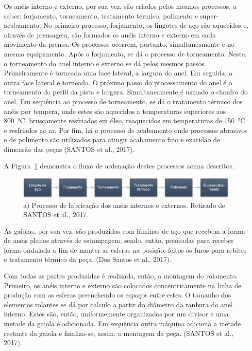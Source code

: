 \documentclass[
	12pt,				
	oneside,			
	a4paper,			
	english,			
	brazil,			
	]{abntex2ppgsi}
\begin{document}
Os anéis interno e externo, por sua vez, são criados pelos mesmos processos, a saber: forjamento, torneamento, tratamento térmico, polimento e super-acabamento. No  primeiro processo, forjamento, os lingotes de aço são aquecidos e, através de prensagem, são formados os anéis interno e externo em cada movimento da prensa. Os processos ocorrem, portanto, simultaneamente e no mesmo equipamento. Após o forjamento, se dá o processo de torneamento. Neste, o torneamento do anel interno e externo se dá pelos mesmos passos. Primeiramente é torneada uma face lateral, a largura do anel. Em seguida, a outra face lateral é torneada. O próximo passo do processamento do anel é o torneamento do perfil da pista e largura. Simultaneamente é usinado o chanfro do anel. Em sequência ao processo de torneamento, se dá o tratamento térmico dos anéis por tempera, onde estes são aquecidos a temperaturas superiores aos \SI{800}{\celsius}, bruscamente resfriados em óleo, reaquecidos em temperaturas de \SI{150}{\celsius} e resfriados ao ar. Por fim, há o processo de acabamento onde processos abrasivos e de polimento são utilizados para atingir acabamento fino e exatidão de dimensão das peças (SANTOS et al., 2017). 


A Figura~\ref{FiguraProcessoFabricacao} demonstra o fluxo de ordenação destes processos acima descritos.
\begin{figure}[!htb]
\centering
\includegraphics[width=\textwidth,height=\textheight,keepaspectratio]{Figura2}
\caption{a) Processo de fabricação dos anéis internos e externos. Retirado de SANTOS et al., 2017.}
\label{FiguraProcessoFabricacao}
\end{figure}

As gaiolas, por sua vez, são produzidas com lâminas de aço que recebem a forma de anéis planos através de estampagem, sendo, então, prensadas para receber forma ondulada a fim de manter as esferas na posição, feitos os furos para rebites e tratamento térmico da peça. (Dos Santos et al., 2017).
 
Com todas as partes produzidas é realizada, então, a montagem do rolamento. Primeiro, os anéis interno e externo são colocados concentricamente na linha de produção com as esferas preenchendo os espaços entre estes. O tamanho dos elementos rolantes se dá por calculo a partir do diâmetro da ranhura do anel interno. Estes são, então, uniformemente organizados por um divisor e uma metade da gaiola é adicionada. Em sequência outra máquina adiciona a metade restante da gaiola e finaliza-se, assim, a montagem da peça. (SANTOS et al., 2017). 
\end{document}
